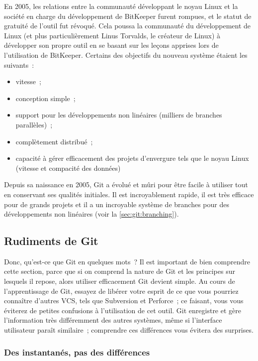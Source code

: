 En 2005, les relations entre la communauté développant le noyau Linux et la société en charge du développement de BitKeeper furent rompues, et le statut de gratuité de l'outil fut révoqué.
Cela poussa la communauté du développement de Linux (et plus particulièrement Linus Torvalds, le créateur de Linux) à développer son propre outil en se basant sur les leçons apprises lors de l'utilisation de BitKeeper.
Certains des objectifs du nouveau système étaient les suivants :

\begin{itemize}
\item vitesse ;
\item conception simple ;
\item support pour les développements non linéaires (milliers de branches parallèles) ;
\item complètement distribué ;
\item capacité à gérer efficacement des projets d'envergure tels que le noyau Linux (vitesse et compacité des données)
\end{itemize}

Depuis sa naissance en 2005, Git a évolué et mûri pour être facile à utiliser tout en conservant ses qualités initiales.
Il est incroyablement rapide, il est très efficace pour de grands projets et il a un incroyable système de branches pour des développements non linéaires (voir la \autoref{sec:git:branching}).

\subsection{Rudiments de Git}

Donc, qu'est-ce que Git en quelques mots ?
Il est important de bien comprendre cette section, parce que si on comprend la nature de Git et les principes sur lesquels il repose, alors utiliser efficacement Git devient simple.
Au cours de l'apprentissage de Git, essayez de libérer votre esprit de ce que vous pourriez connaître d'autres VCS, tels que Subversion et Perforce ;
ce faisant, vous vous éviterez de petites confusions à l'utilisation de cet outil.
Git enregistre et gère l'information très différemment des autres systèmes, même si l'interface utilisateur paraît similaire ;
comprendre ces différences vous évitera des surprises.

\subsubsection{Des instantanés, pas des différences}

